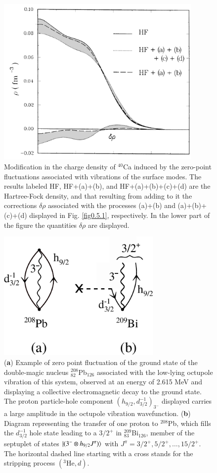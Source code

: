 \begin{figure}
	\centerline {
		\includegraphics*[width=10cm, angle=0.]{introduccion/figs/fig0_8_2}
	}
	\caption{Modification in the charge density of $^{40}$Ca induced by the zero-point fluctuations associated with vibrations of the surface modes. The results labeled HF, HF+(a)+(b), and HF+(a)+(b)+(c)+(d) are the Hartree-Fock density, and that resulting from adding to it the corrections $\delta\rho$ associated with the processes (a)+(b) and (a)+(b)+(c)+(d) displayed in Fig. \ref{fig0.5.1}, respectively. In the lower part of the figure the  quantities $\delta\rho$ are displayed.}
	\label{fig0.5.2}
\end{figure}
\begin{figure}
	\centerline {
		\includegraphics*[width=8cm, angle=0.]{introduccion/figs/fig0_5_3}
	}
	\caption{(\textbf{a}) Example of zero point fluctuation of the ground state of the double-magic nucleus $^{208}_{82}$Pb$_{126}$ associated with the low-lying octupole vibration of this system, observed at an energy of 2.615 MeV and displaying a collective electromagnetic decay to the ground state. The proton particle-hole component $(h_{9/2},d^{-1}_{3/2})_{3^-}$ displayed carries a large amplitude in the octupole vibration wavefunction. (\textbf{b}) Diagram representing the transfer of one proton to $^{208}$Pb, which fills the $d_{3/2}^{-1}$ hole state leading to a $3/2^+$ in $^{209}_{83}$Bi$_{126}$, member of the septuplet of states $|{(3^-\otimes h_{9/2}J^\pi)} \rangle$ with $J^\pi=3/2^+,5/2^+,\dots,15/2^+$. The horizontal dashed line starting with a cross stands for the stripping process $(^3\text{He},d)$.}
	\label{fig0.5.3}
\end{figure}
